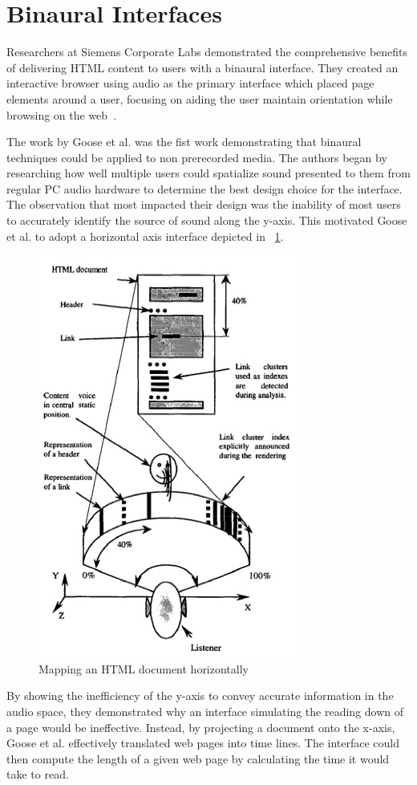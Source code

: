 \section{                  Binaural Interfaces                                }

Researchers at Siemens Corporate Labs demonstrated the comprehensive benefits
of delivering HTML content to users with a binaural interface.  They created
an interactive browser using audio as the primary interface which placed page
elements around a user, focusing on aiding the user maintain orientation while
browsing on the web~\cite{goose19993dAudio}.

The work by Goose et al. was the fist work demonstrating that binaural techniques
could be applied to non prerecorded media. The authors began by researching
how well multiple users could spatialize sound presented to them from regular
PC audio hardware to determine the best design choice for the interface. The
observation that most impacted their design was the inability of most users
to accurately identify the source of sound along the y-axis.  This motivated
Goose et al. to adopt a horizontal axis interface depicted in ~\ref{fig:goose_horizon}.

\begin{figure}[t]
    \centering
    \includegraphics[width=.4\linewidth]{images/goose_horizon.jpg}
    \caption{Mapping an HTML document horizontally}
    \label{fig:goose_horizon}
\end{figure}


By showing the inefficiency of the y-axis to convey accurate information in the
audio space, they demonstrated why an interface simulating the reading down of
a page would be ineffective. Instead, by projecting a document onto the x-axis,
Goose et al. effectively translated web pages into time lines.  The interface
could then compute the length of a given web page by calculating the time it
would take to read.

